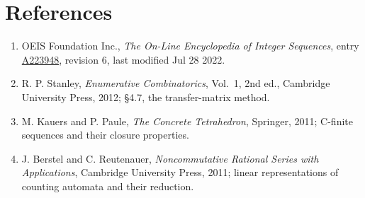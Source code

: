 \documentclass[11pt]{article}
\theoremstyle{definition}
\begin{document}
\section{References}

\begin{enumerate}

\item OEIS Foundation Inc., \emph{The On-Line Encyclopedia of Integer Sequences}, entry \href{https://oeis.org/A223948}{A223948}, revision 6, last modified Jul 28 2022.

\item R. P. Stanley, \emph{Enumerative Combinatorics}, Vol.~1, 2nd ed., Cambridge University Press, 2012; \S4.7, the transfer-matrix method.

\item M. Kauers and P. Paule, \emph{The Concrete Tetrahedron}, Springer, 2011; C-finite sequences and their closure properties.

\item J. Berstel and C. Reutenauer, \emph{Noncommutative Rational Series with Applications}, Cambridge University Press, 2011; linear representations of counting automata and their reduction.

\end{enumerate}
\end{document}
